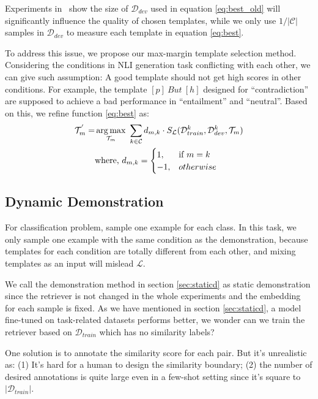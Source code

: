 Experiments in~\citet{DBLP:conf/acl/GaoFC20} show the size of $\mathcal{D}_{dev}$ used in equation \ref{eq:best_old} will significantly influence the quality of chosen templates, while we only use $1/|\mathcal{C}|$ samples in $\mathcal{D}_{dev}$ to measure each template in equation \ref{eq:best}.

To address this issue, we propose our max-margin template selection method. Considering the conditions in NLI generation task conflicting with each other, we can give such assumption: A good template should not get high scores in other conditions. For example, the template $[p]\ But\ [h]$ designed for ``contradiction'' are supposed to achieve a bad performance in ``entailment'' and ``neutral''. Based on this, we refine function \ref{eq:best} as:
\begin{align}
	\mathcal{T}_m^{'}=&\mathop{\arg\max}\limits_{\mathcal{T}_m}\ \sum_{k\in\mathcal{C}} d_{m,k}\cdot S_{\mathcal{L}}(\mathcal{D}_{train}^k, \mathcal{D}_{dev}^k, \mathcal{T}_m) \notag\\
	&\mbox{where,}\ d_{m,k} =
	\begin{cases} 
		1,  & \mbox{if }m=k \\
		-1, & otherwise
	\end{cases}
	\label{eq:mm}
\end{align}

\subsection{Dynamic Demonstration}

For classification problem, \citet{DBLP:conf/acl/GaoFC20} sample one example for each class. In this task, we only sample one example with the same condition as the demonstration, because templates for each condition are totally different from each other, and mixing templates as an input will mislead $\mathcal{L}$. 

We call the demonstration method in section \ref{sec:staticd} as static demonstration since the retriever is not changed in the whole experiments and the embedding for each sample is fixed. As we have mentioned in section \ref{sec:staticd}, a model fine-tuned on task-related datasets performs better, we wonder can we train the retriever based on $\mathcal{D}_{train}$ which has no similarity labels?

One solution is to annotate the similarity score for each pair. But it's unrealistic as:
(1) It's hard for a human to design the similarity boundary;
(2) the number of desired annotations is quite large even in a few-shot setting since it's square to $\left| \mathcal{D}_{train}\right|$.

